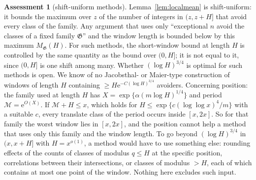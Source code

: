 \documentclass[10pt,reqno]{amsart}
\theoremstyle{definition}
\newtheorem{assessment}[theorem]{Assessment}
\newcommand{\M}{\mathcal M}
\newcommand{\e}{\mathrm e}
\begin{document}
\begin{assessment}[shift-uniform methods]\label{ass:shift}
Lemma~\ref{lem:localmean} is shift-uniform: it bounds the maximum over
$z$ of the number of integers in $(z,z+H]$ that avoid every class of the
family.  Any argument that uses only ``exceptional $n$ avoid the classes
of a fixed family $\mathfrak G$'' and the window length is bounded below
by this maximum $M_{\mathfrak G}(H)$.  For such methods, the short-window
bound at length $H$ is controlled by the same quantity as the bound over
$(0,H]$; it is not equal to it, since $(0,H]$ is one shift among many.
Whether $(\log H)^{3/4}$ is optimal for such methods is open.  We know
of no Jacobsthal- or Maier-type construction of windows of length $H$
containing $\geq H\e^{-C(\log H)^{3/4}}$ avoiders.  Concerning position:
the family used at length $H$ has $X=\exp\{\alpha(m\log H)^{1/4}\}$ and
period $\M=\e^{O(X)}$.  If $\M+H\leq x$, which holds for
$H\leq\exp\{c(\log\log x)^4/m\}$ with a suitable $c$, every translate
class of the period occurs inside $[x,2x]$.  So for that family the
worst window lies in $[x,2x]$, and the position cannot help a method that
uses only this family and the window length.  To go beyond
$(\log H)^{3/4}$ in $(x,x+H]$ with $H=x^{o(1)}$, a method would have to
use something else: rounding effects of the counts of classes of modulus
$q\leq H$ at the specific position, correlations between their
intersections, or classes of modulus $>H$, each of which contains at most
one point of the window.  Nothing here excludes such input.
\end{assessment}
\end{document}
